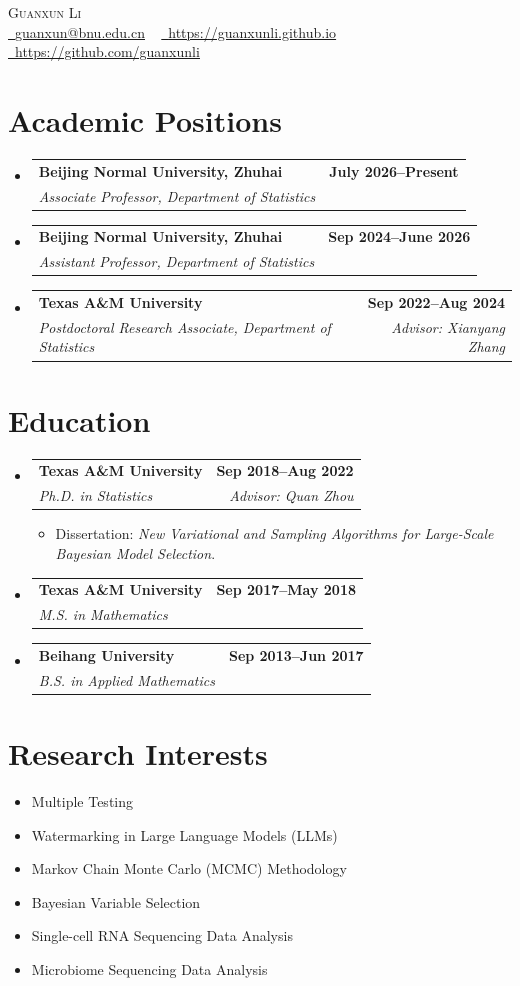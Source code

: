 \documentclass[letterpaper,11pt]{article}
\makeatletter
\newcommand{\resumeSubheading}[4]{
  \vspace{-2pt}\item
  \begin{tabular*}{1.0\textwidth}{l@{\extracolsep{\fill}}r}
    \textbf{#1} & \textbf{\small #2} \\
    \textit{\small #3} & \textit{\small #4} \\
  \end{tabular*}\vspace{-7pt}
}
\newcommand{\resumeItem}[1]{
  \item\small{
    {#1 \vspace{-3pt}}
  }
}
\newcommand{\resumeItemListStart}{\begin{itemize}}
\newcommand{\resumeItemListEnd}{\end{itemize}}
\makeatother
\begin{document}
\begin{center}
    {\Huge\scshape Guanxun Li} \\ \vspace{2pt}
    \small \href{mailto:guanxun@bnu.edu.cn}{\raisebox{-0.2\height}\faEnvelope\ \underline{guanxun@bnu.edu.cn}} ~ 
    \href{https://guanxunli.github.io}{\raisebox{-0.2\height}\faGlobe\ \underline{https://guanxunli.github.io}} ~
    \href{https://github.com/guanxunli}{\raisebox{-0.2\height}\faGithub\ \underline{https://github.com/guanxunli}}
\end{center}

\section{Academic Positions}
\begin{itemize}[leftmargin=0.15in, label={}]
    \resumeSubheading
    {Beijing Normal University, Zhuhai}{July 2026--Present}
    {Associate Professor, Department of Statistics}{}
    \resumeSubheading
    {Beijing Normal University, Zhuhai}{Sep 2024--June 2026}
    {Assistant Professor, Department of Statistics}{}
    \resumeSubheading
    {Texas A\&M University}{Sep 2022--Aug 2024}
    {Postdoctoral Research Associate, Department of Statistics}{Advisor: Xianyang Zhang}
\end{itemize}

\section{Education}
\begin{itemize}[leftmargin=0.15in, label={}]
    \resumeSubheading
    {Texas A\&M University}{Sep 2018--Aug 2022}
    {Ph.D. in Statistics}{Advisor: Quan Zhou}
    \resumeItemListStart
        \resumeItem{Dissertation: \textit{New Variational and Sampling Algorithms for Large-Scale Bayesian Model Selection}.}
    \resumeItemListEnd
    \resumeSubheading
    {Texas A\&M University}{Sep 2017--May 2018}
    {M.S. in Mathematics}{}
    \resumeSubheading
    {Beihang University}{Sep 2013--Jun 2017}
    {B.S. in Applied Mathematics}{}
\end{itemize}

\section{Research Interests}
\begin{itemize}[leftmargin=0.15in, label={}]
    \item Multiple Testing
    \item Watermarking in Large Language Models (LLMs)
    \item Markov Chain Monte Carlo (MCMC) Methodology
    \item Bayesian Variable Selection
    \item Single-cell RNA Sequencing Data Analysis
    \item Microbiome Sequencing Data Analysis
\end{itemize}
\end{document}
